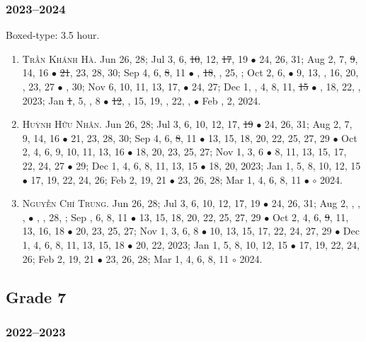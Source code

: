 \documentclass{article}
\begin{document}
\subsubsection{2023--2024}
Boxed-type: 3.5 hour.
\begin{enumerate}
	\item \textsc{Trần Khánh Hà.} {\sf[In]} Jun 26, 28; Jul 3, 6, \st{10}, 12, \st{17}, 19 $\bullet$ 24, 26, 31; Aug 2, 7, \st{9}, 14, 16 $\bullet$ \st{21}, 23, 28, 30; Sep 4, 6, \st{8}, 11 $\bullet$ , \st{18}, , 25, ; Oct 2, 6,   $\bullet$ 9, 13, , 16, 20, , 23, 27 $\bullet$ , 30; Nov 6, 10, 11, 13, 17,  $\bullet$ 24, 27; Dec 1, , 4, 8, 11, \st{15} $\bullet$ , 18, 22, , 2023; Jan \st{1}, 5, , 8  $\bullet$ \st{12}, , 15, 19, , 22, ,  $\bullet$ Feb , 2, 2024.
	\item \textsc{Huỳnh Hữu Nhân.} {\sf[In]} Jun 26, 28; Jul 3, 6, 10, 12, 17, \st{19} $\bullet$ 24, 26, 31; Aug 2, 7, 9, 14, 16 $\bullet$ 21, 23, 28, 30; Sep 4, 6, \st{8}, 11 $\bullet$ 13, 15, 18, 20, 22, 25, 27, 29 $\bullet$ Oct 2, 4, 6, 9, 10, 11, 13, 16 $\bullet$ 18, 20, 23, 25, 27; Nov 1, 3, 6 $\bullet$ 8, 11, 13, 15, 17, 22, 24, 27 $\bullet$ 29; Dec 1, 4, 6, 8, 11, 13, 15 $\bullet$ 18, 20, 2023; Jan 1, 5, 8, 10, 12, 15 $\bullet$ 17, 19, 22, 24, 26; Feb 2, 19, 21 $\bullet$ 23, 26, 28; Mar 1, 4, 6, 8, 11 $\bullet$ $\circ$ 2024.
	\item \textsc{Nguyễn Chí Trung.} {\sf[In]} Jun 26, 28; Jul 3, 6, 10, 12, 17, 19 $\bullet$ 24, 26, 31; Aug 2, , , ,  $\bullet$ , , 28, ; Sep , 6, 8, 11 $\bullet$ 13, 15, 18, 20, 22, 25, 27, 29 $\bullet$ Oct 2, 4, 6, \st{9}, 11, 13, 16, 18 $\bullet$ 20, 23, 25, 27; Nov 1, 3, 6, 8 $\bullet$ 10, 13, 15, 17, 22, 24, 27, 29 $\bullet$ Dec 1, 4, 6, 8, 11, 13, 15, 18 $\bullet$ 20, 22, 2023; Jan 1, 5, 8, 10, 12, 15 $\bullet$ 17, 19, 22, 24, 26; Feb 2, 19, 21 $\bullet$ 23, 26, 28; Mar 1, 4, 6, 8, 11 $\circ$ 2024.
\end{enumerate}

\subsection{Grade 7}

\subsubsection{2022--2023}
\end{document}
